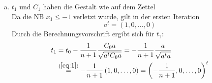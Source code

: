 \documentclass[11pt,a4paper,ngerman]{article}
\begin{document}
\begin{enumerate}[(a)]
\item $t_1$ und $C_1$ haben die Gestalt wie auf dem Zettel \\
    Da die NB $x_1 \leq -1$ verletzt wurde, gilt in der ersten Iteration
    \begin{equation}\label{eq:1}
      a^t = \left(1,0,\ldots,0 \right)
    \end{equation}
    Durch die Berechnungsvorschrift ergibt sich für $t_1$:
    \begin{equation*}\begin{split}
      t_1 &= t_0 -\frac{1}{n+1} \frac{C_0 a}{\sqrt{a^t C_0 a}}
          = -\frac{1}{n+1} \frac{a}{\sqrt{a^t a}} \\
          &\stackrel{(\ref{eq:1})}{=} -\frac{1}{n+1} \left(1,0,\ldots,0 \right)
          = \left(-\frac{1}{n+1},0,\ldots,0 \right)^t
    \end{split}\end{equation*}
    

\end{enumerate}
\end{document}
